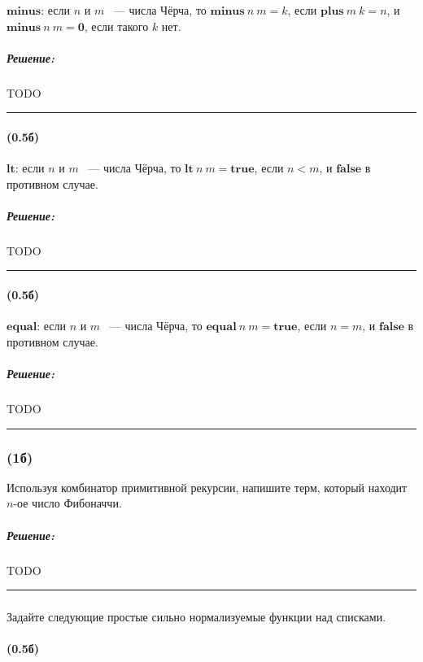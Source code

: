 \documentclass{article}
\newenvironment{proof}{\subparagraph{\hspace{-1em}Решение:\newline}}{\par\noindent\rule{\textwidth}{0.4pt}}
\newcommand{\term}[1]{\mathbf{#1}}
\begin{document}
    $\term{minus}$: если $n$ и $m$ ~--- числа Чёрча, то $\term{minus}~n~m = k$,
    если $\term{plus}~m~k = n$, и $\term{minus}~n~m = \term{0}$, если такого $k$
    нет.

    \begin{proof}
        TODO %
    \end{proof}

    \paragraph{(0.5б)}

    $\term{lt}$: если $n$ и $m$ ~--- числа Чёрча, то $\term{lt}~n~m = \term{true}$, если $n < m$, и $\term{false}$ в противном случае.

    \begin{proof}
        TODO %
    \end{proof}

    \paragraph{(0.5б)}

    $\term{equal}$: если $n$ и $m$ ~--- числа Чёрча, то $\term{equal}~n~m = \term{true}$, если $n = m$, и $\term{false}$ в противном случае.

    \begin{proof}
        TODO %
    \end{proof}

    \subsubsection{(1б)}

    Используя комбинатор примитивной рекурсии, напишите терм, который
    находит $n$-ое число Фибоначчи.

    \begin{proof}
        TODO %
    \end{proof}

    \subsubsection{}

    Задайте следующие простые сильно нормализуемые функции над списками.

    \paragraph{(0.5б)}
\end{document}
